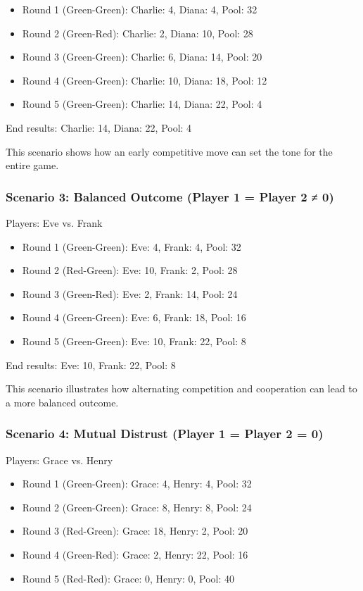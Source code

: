 \documentclass[12pt,a4paper]{article}
\begin{document}
\begin{itemize}
    \item Round 1 (Green-Green): Charlie: 4, Diana: 4, Pool: 32
    \item Round 2 (Green-Red): Charlie: 2, Diana: 10, Pool: 28
    \item Round 3 (Green-Green): Charlie: 6, Diana: 14, Pool: 20
    \item Round 4 (Green-Green): Charlie: 10, Diana: 18, Pool: 12
    \item Round 5 (Green-Green): Charlie: 14, Diana: 22, Pool: 4
\end{itemize}

End results: Charlie: 14, Diana: 22, Pool: 4

This scenario shows how an early competitive move can set the tone for the entire game.

\subsubsection{Scenario 3: Balanced Outcome (Player 1 = Player 2 ≠ 0)}
Players: Eve vs. Frank

\begin{itemize}
    \item Round 1 (Green-Green): Eve: 4, Frank: 4, Pool: 32
    \item Round 2 (Red-Green): Eve: 10, Frank: 2, Pool: 28
    \item Round 3 (Green-Red): Eve: 2, Frank: 14, Pool: 24
    \item Round 4 (Green-Green): Eve: 6, Frank: 18, Pool: 16
    \item Round 5 (Green-Green): Eve: 10, Frank: 22, Pool: 8
\end{itemize}

End results: Eve: 10, Frank: 22, Pool: 8

This scenario illustrates how alternating competition and cooperation can lead to a more balanced outcome.

\subsubsection{Scenario 4: Mutual Distrust (Player 1 = Player 2 = 0)}
Players: Grace vs. Henry

\begin{itemize}
    \item Round 1 (Green-Green): Grace: 4, Henry: 4, Pool: 32
    \item Round 2 (Green-Green): Grace: 8, Henry: 8, Pool: 24
    \item Round 3 (Red-Green): Grace: 18, Henry: 2, Pool: 20
    \item Round 4 (Green-Red): Grace: 2, Henry: 22, Pool: 16
    \item Round 5 (Red-Red): Grace: 0, Henry: 0, Pool: 40
\end{itemize}
\end{document}
